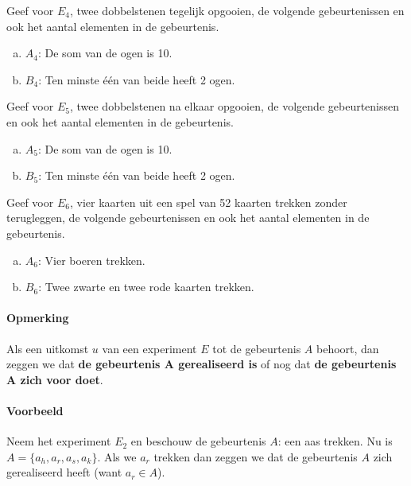 \documentclass[12pt,a4paper,twoside]{article}
\begin{document}
\begin{oefening}
Geef voor $E_4$, twee dobbelstenen tegelijk opgooien, de volgende gebeurtenissen en ook het aantal elementen in de gebeurtenis.
\begin{enumerate}[(a)]
  \item $A_4$: De som van de ogen is 10.
  \item $B_4$: Ten minste één van beide heeft 2 ogen.
\end{enumerate}
\end{oefening}

\begin{oefening}
Geef voor $E_5$, twee dobbelstenen na elkaar opgooien, de volgende gebeurtenissen en ook het aantal elementen in de gebeurtenis.
\begin{enumerate}[(a)]
  \item $A_5$: De som van de ogen is 10.
  \item $B_5$: Ten minste één van beide heeft 2 ogen.
\end{enumerate}
\end{oefening}

\begin{oefening}
Geef voor $E_6$, vier kaarten uit een spel van 52 kaarten trekken zonder terugleggen, de volgende gebeurtenissen en ook het aantal elementen in de gebeurtenis.
\begin{enumerate}[(a)]
  \item $A_6$: Vier boeren trekken.
  \item $B_6$: Twee zwarte en twee rode kaarten trekken.
\end{enumerate}
\end{oefening}

\paragraph*{Opmerking}
Als een uitkomst $u$ van een experiment $E$ tot de gebeurtenis $A$ behoort, dan zeggen we dat {\bf de gebeurtenis A gerealiseerd is} of nog dat {\bf de gebeurtenis A zich voor doet}.

\paragraph*{Voorbeeld}
Neem het experiment $E_2$ en beschouw de gebeurtenis $A$: een aas trekken. Nu is $A = \{a_h , a_r , a_s , a_k \}$.
Als we $a_r$ trekken dan zeggen we dat de gebeurtenis $A$ zich gerealiseerd heeft (want $a_r \in A$).
\end{document}
